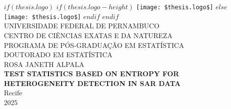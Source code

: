  \makeatletter
\renewcommand{\cleardoublepage}{\clearpage} %
\makeatother

\frontmatter %

\pagestyle{plain} %



\begin{titlepage}
  \begin{center}
  
			$if(thesis.logo)$
			$if(thesis.logo-height)$
			\texttt{[image: \$thesis.logo\$]} %
			$else$
			\texttt{[image: \$thesis.logo\$]}
			$endif$
			$endif$\\[0.3cm]
    
    {\large\MakeUppercase{UNIVERSIDADE FEDERAL DE PERNAMBUCO}}\\
    {\large\MakeUppercase{CENTRO DE CIÊNCIAS EXATAS E DA NATUREZA}}\\
    {\large\MakeUppercase{PROGRAMA DE PÓS-GRADUAÇÃO EM ESTATÍSTICA}}\\
    {\large\MakeUppercase{DOUTORADO EM ESTATÍSTICA}}\\[4cm]
		
    {\large ROSA JANETH ALPALA}\\[3cm]
    
    {\Large \textbf{TEST STATISTICS BASED ON ENTROPY FOR HETEROGENEITY DETECTION IN SAR DATA}}\\[6cm]
    

		
%
   {\large Recife}\\
   {\large 2025}
    
  \end{center}
\end{titlepage}

